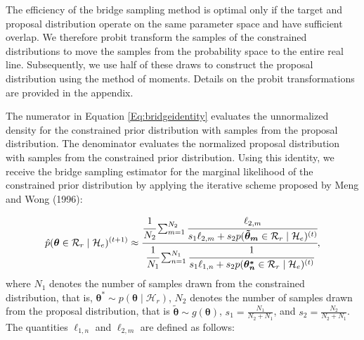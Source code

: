 \documentclass[
  english,
  man,floatsintext]{apa6}
\begin{document}
The efficiency of the bridge sampling method is optimal only if the target and proposal distribution operate on the same parameter space and have sufficient overlap. We therefore probit transform the samples of the constrained distributions to move the samples from the probability space to the entire real line. Subsequently, we use half of these draws to construct the proposal distribution using the method of moments. Details on the probit transformations are provided in the appendix.

The numerator in Equation \ref{Eq:bridgeidentity} evaluates the unnormalized density for the constrained prior distribution with samples from the proposal distribution. The denominator evaluates the normalized proposal distribution with samples from the constrained prior distribution. Using this identity, we receive the bridge sampling estimator for the marginal likelihood of the constrained prior distribution by applying the iterative scheme proposed by Meng and Wong (1996):

\begin{align*}
    \hat p(\boldsymbol{\theta} \in \mathcal{R}_r \mid \mathcal{H}_e)^{(t+1)} \approx \cfrac{\cfrac{1}{N_2} \sum_{m = 1}^{N_2} \cfrac{\ell_{2,m}}{s_1 \ell_{2,m} + s_2 p(\boldsymbol{\tilde \theta_m} \in \mathcal{R}_r \mid \mathcal{H}_e)^{(t)}}}
    {\cfrac{1}{N_1} \sum_{n = 1}^{N_1} \cfrac{1}{s_1 \ell_{1,n} + s_2 p(\boldsymbol{\theta^*_n} \in \mathcal{R}_r \mid \mathcal{H}_e)^{(t)}}},
\end{align*}
where \(N_1\) denotes the number of samples drawn from the constrained distribution, that is, \(\boldsymbol{\theta}^* \sim p(\boldsymbol{\theta} \mid \mathcal{H}_r)\), \(N_2\) denotes the number of samples drawn from the proposal distribution, that is \(\boldsymbol{\tilde \theta} \sim g(\boldsymbol{\theta})\),
\(s_1 = \frac{N_1}{N_2 + N_1}\), and \(s_2 = \frac{N_2}{N_2 + N_1}\). The quantities \(\ell_{1,n}\) and \(\ell_{2,m}\) are defined as follows:
\end{document}
